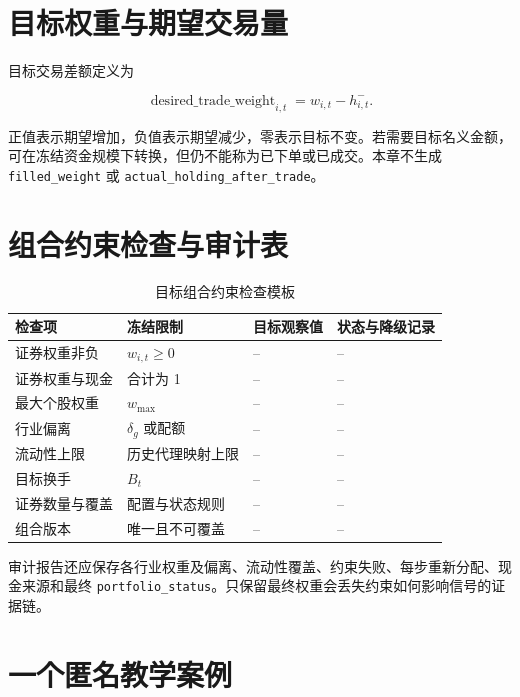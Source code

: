 \section{目标权重与期望交易量}

目标交易差额定义为

\begin{equation}
  \operatorname{desired\_trade\_weight}_{i,t}
  = w_{i,t}-h^-_{i,t}.
  \label{eq:ch09-desired-trade}
\end{equation}

正值表示期望增加，负值表示期望减少，零表示目标不变。若需要目标名义金额，可在冻结资金规模下转换，但仍不能称为已下单或已成交。本章不生成 \texttt{filled\_weight} 或 \texttt{actual\_holding\_after\_trade}。

\section{组合约束检查与审计表}

\begin{table}[htbp]
  \centering
  \small
  \caption{目标组合约束检查模板}
  \label{tab:ch09-constraint-audit}
  \begin{tabularx}{\textwidth}{p{3.2cm} p{3.1cm} p{3.1cm} Y}
    \toprule
    检查项 & 冻结限制 & 目标观察值 & 状态与降级记录 \\
    \midrule
    证券权重非负 & \(w_{i,t}\ge0\) & -- & -- \\
    证券权重与现金 & 合计为 1 & -- & -- \\
    最大个股权重 & \(w_{\max}\) & -- & -- \\
    行业偏离 & \(\delta_g\) 或配额 & -- & -- \\
    流动性上限 & 历史代理映射上限 & -- & -- \\
    目标换手 & \(B_t\) & -- & -- \\
    证券数量与覆盖 & 配置与状态规则 & -- & -- \\
    组合版本 & 唯一且不可覆盖 & -- & -- \\
    \bottomrule
  \end{tabularx}
\end{table}

审计报告还应保存各行业权重及偏离、流动性覆盖、约束失败、每步重新分配、现金来源和最终 \texttt{portfolio\_status}。只保留最终权重会丢失约束如何影响信号的证据链。

\section{一个匿名教学案例}

